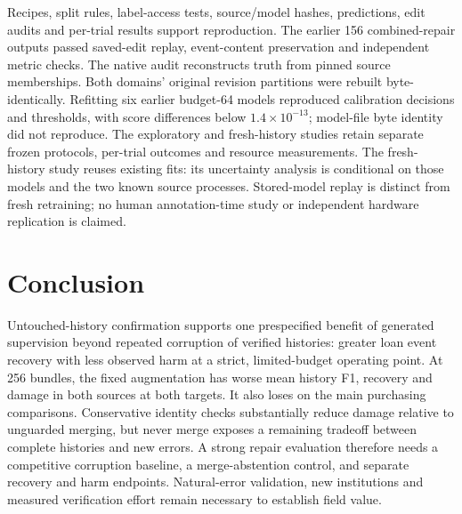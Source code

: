 \documentclass[11pt]{article}
\begin{document}
Recipes, split rules, label-access tests, source/model hashes, predictions, edit audits and per-trial results support reproduction. The earlier 156 combined-repair outputs passed saved-edit replay, event-content preservation and independent metric checks. The native audit reconstructs truth from pinned source memberships. Both domains' original revision partitions were rebuilt byte-identically. Refitting six earlier budget-64 models reproduced calibration decisions and thresholds, with score differences below $1.4\times10^{-13}$; model-file byte identity did not reproduce. The exploratory and fresh-history studies retain separate frozen protocols, per-trial outcomes and resource measurements. The fresh-history study reuses existing fits: its uncertainty analysis is conditional on those models and the two known source processes. Stored-model replay is distinct from fresh retraining; no human annotation-time study or independent hardware replication is claimed.

\section{Conclusion}
Untouched-history confirmation supports one prespecified benefit of generated supervision beyond repeated corruption of verified histories: greater loan event recovery with less observed harm at a strict, limited-budget operating point. At 256 bundles, the fixed augmentation has worse mean history F1, recovery and damage in both sources at both targets. It also loses on the main purchasing comparisons. Conservative identity checks substantially reduce damage relative to unguarded merging, but never merge exposes a remaining tradeoff between complete histories and new errors. A strong repair evaluation therefore needs a competitive corruption baseline, a merge-abstention control, and separate recovery and harm endpoints. Natural-error validation, new institutions and measured verification effort remain necessary to establish field value.


\end{document}
